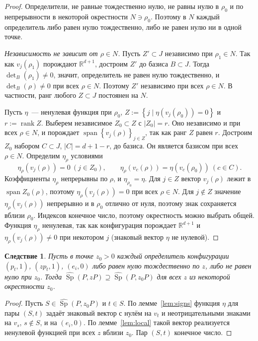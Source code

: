 \documentclass[a4paper,11pt]{article}
\theoremstyle{plain}
\newtheorem{corollary}[theorem]{Следствие}
\theoremstyle{definition}
\theoremstyle{remark}
\newcommand{\R}{\mathbb{R}}
\newcommand{\abs}[1]{\left\lvert #1 \right\rvert}
\newcommand{\set}[1]{\left\{ #1 \right\}}
\DeclareMathOperator{\Sp}{Sp}
\begin{document}
\begin{proof}
    Определители, не равные тождественно нулю, не равны нулю в $\rho_0$ и по непрерывности в некоторой окрестности $N\ni\rho_0$. Поэтому в $N$ каждый определитель либо равен нулю тождественно, либо не равен нулю ни в одной точке.

    \emph{Независимость не зависит от $\rho\in N$.} Пусть $Z'\subset J$ независимо при $\rho_1\in N$. Так как $v_j(\rho_1)$ порождают $\R^{d+1}$, достроим $Z'$ до базиса $B\subset J$. Тогда $\det_B(\rho_1)\ne0$, значит, определитель не равен нулю тождественно, и $\det_B(\rho)\ne0$ при всех $\rho\in N$. Поэтому $Z'$ независимо при всех $\rho\in N$. В частности, ранг любого $Z\subset J$ постоянен на $N$.

    Пусть $\eta$~--- ненулевая функция при $\rho_0$, $Z:=\set{j\mid\eta(v_j(\rho_0))=0}$ и $r:=\operatorname{rank}Z$. Выберем независимое $Z_0\subset Z$ с $\abs{Z_0}=r$. Оно независимо и при всех $\rho\in N$, и порождает $\operatorname{span}\set{v_j(\rho)}_{j\in Z}$, так как ранг $Z$ равен $r$. Достроим $Z_0$ набором $C\subset J$, $\abs{C}=d+1-r$, до базиса. Он является базисом при всех $\rho\in N$. Определим $\eta_\rho$ условиями
    \[
        \eta_\rho(v_j(\rho))=0\ (j\in Z_0),\qquad\eta_\rho(v_c(\rho))=\eta(v_c(\rho_0))\ (c\in C).
    \]
    Коэффициенты $\eta_\rho$ непрерывны по $\rho$, и $\eta_{\rho_0}=\eta$. Для $j\in Z$ вектор $v_j(\rho)$ лежит в $\operatorname{span}Z_0(\rho)$, поэтому $\eta_\rho(v_j(\rho))=0$ при всех $\rho\in N$. Для $j\notin Z$ значение $\eta_\rho(v_j(\rho))$ непрерывно и в $\rho_0$ отлично от нуля, поэтому знак сохраняется вблизи $\rho_0$. Индексов конечное число, поэтому окрестность можно выбрать общей. Функция $\eta_\rho$ ненулевая, так как конфигурация порождает $\R^{d+1}$ и $\eta_\rho(v_j(\rho))\ne0$ при некотором $j$ (знаковый вектор $\eta$ не нулевой).
\end{proof}

\begin{corollary}\label{cor:local}
    Пусть в точке $z_0>0$ каждый определитель конфигурации $(p_t,1)$, $(zp_t,1)$, $(e_i,0)$ либо равен нулю тождественно по $z$, либо не равен нулю при $z_0$. Тогда $\widehat{\Sp}(P,zP)\supseteq\widehat{\Sp}(P,z_0P)$ для всех $z$ из некоторой окрестности $z_0$.
\end{corollary}

\begin{proof}
    Пусть $S\in\widehat{\Sp}(P,z_0P)$ и $t\in S$. По лемме~\ref{lem:signs} функция $\eta$ для пары $(S,t)$ задаёт знаковый вектор с нулём на $v_t$ и неотрицательными знаками на $v_s$, $s\notin S$, и на $(e_i,0)$. По лемме~\ref{lem:local} такой вектор реализуется ненулевой функцией при всех $z$ вблизи $z_0$. Пар $(S,t)$ конечное число.
\end{proof}
\end{document}
